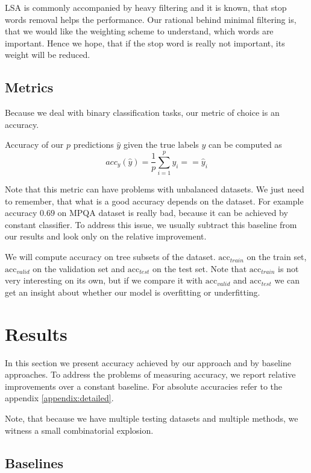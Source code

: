     LSA is commonly accompanied by heavy filtering and it is known, that stop words removal helps the performance.
    Our rational behind minimal filtering is, that we would like the weighting scheme to understand, which words are important.
    Hence we hope, that if the stop word is really not important, its weight will be reduced.
    
    \subsection{Metrics}
    
    Because we deal with binary classification tasks, our metric of choice is an accuracy.
    
    Accuracy of our $p$ predictions $\hat{y}$ given the true labels $y$ can be computed as
    $$acc_y(\hat{y}) = \frac{1}{p}\sum_{i=1}^py_i ==\hat{y}_i$$
    
    Note that this metric can have problems with unbalanced datasets. 
    We just need to remember, that what is a good accuracy depends on the dataset.
    For example accuracy $0.69$ on MPQA dataset is really bad, because it can be achieved by constant classifier.
    To address this issue, we usually subtract this baseline from our results and look only on the relative improvement. 
    
    We will compute accuracy on tree subsets of the dataset. 
    $\mathrm{acc}_{train}$ on the train set, $\mathrm{acc}_{valid}$ on the validation set and $\mathrm{acc}_{test}$ on the test set.
    Note that $\mathrm{acc}_{train}$ is not very interesting on its own, but if we compare it with $\mathrm{acc}_{valid}$ and $\mathrm{acc}_{test}$ we can get an insight about whether our model is overfitting or underfitting.


\section{Results}
    In this section we present accuracy achieved by our approach and by baseline approaches.
    To address the problems of measuring accuracy, we report relative improvements over a constant baseline.
    For absolute accuracies refer to the appendix \ref{appendix:detailed}. 

    Note, that because we have multiple testing datasets and multiple methods, we witness a small combinatorial explosion.

    \subsection{Baselines} \label{sec:baseline}

